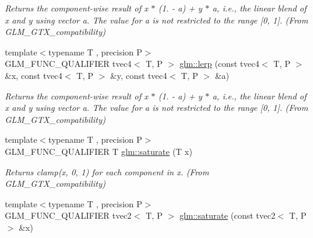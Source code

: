 \begin{DoxyCompactItemize}
\begin{DoxyCompactList}\small\item\em Returns the component-\/wise result of x $\ast$ (1. -\/ a) + y $\ast$ a, i.\-e., the linear blend of x and y using vector a. The value for a is not restricted to the range \mbox{[}0, 1\mbox{]}. (From G\-L\-M\-\_\-\-G\-T\-X\-\_\-compatibility) \end{DoxyCompactList}\item 
\hypertarget{group__gtx__compatibility_gae4b0244b0d882657bed0a99dfa33f379}{{\footnotesize template$<$typename T , precision P$>$ }\\G\-L\-M\-\_\-\-F\-U\-N\-C\-\_\-\-Q\-U\-A\-L\-I\-F\-I\-E\-R tvec4$<$ T, P $>$ \hyperlink{group__gtx__compatibility_gae4b0244b0d882657bed0a99dfa33f379}{glm\-::lerp} (const tvec4$<$ T, P $>$ \&x, const tvec4$<$ T, P $>$ \&y, const tvec4$<$ T, P $>$ \&a)}\label{group__gtx__compatibility_gae4b0244b0d882657bed0a99dfa33f379}

\begin{DoxyCompactList}\small\item\em Returns the component-\/wise result of x $\ast$ (1. -\/ a) + y $\ast$ a, i.\-e., the linear blend of x and y using vector a. The value for a is not restricted to the range \mbox{[}0, 1\mbox{]}. (From G\-L\-M\-\_\-\-G\-T\-X\-\_\-compatibility) \end{DoxyCompactList}\item 
\hypertarget{group__gtx__compatibility_ga0fd09e616d122bc2ed9726682ffd44b7}{{\footnotesize template$<$typename T , precision P$>$ }\\G\-L\-M\-\_\-\-F\-U\-N\-C\-\_\-\-Q\-U\-A\-L\-I\-F\-I\-E\-R T \hyperlink{group__gtx__compatibility_ga0fd09e616d122bc2ed9726682ffd44b7}{glm\-::saturate} (T x)}\label{group__gtx__compatibility_ga0fd09e616d122bc2ed9726682ffd44b7}

\begin{DoxyCompactList}\small\item\em Returns clamp(x, 0, 1) for each component in x. (From G\-L\-M\-\_\-\-G\-T\-X\-\_\-compatibility) \end{DoxyCompactList}\item 
\hypertarget{group__gtx__compatibility_ga5815a26488231dfdf92242cf0c2d2107}{{\footnotesize template$<$typename T , precision P$>$ }\\G\-L\-M\-\_\-\-F\-U\-N\-C\-\_\-\-Q\-U\-A\-L\-I\-F\-I\-E\-R tvec2$<$ T, P $>$ \hyperlink{group__gtx__compatibility_ga5815a26488231dfdf92242cf0c2d2107}{glm\-::saturate} (const tvec2$<$ T, P $>$ \&x)}\label{group__gtx__compatibility_ga5815a26488231dfdf92242cf0c2d2107}


\end{DoxyCompactItemize}
